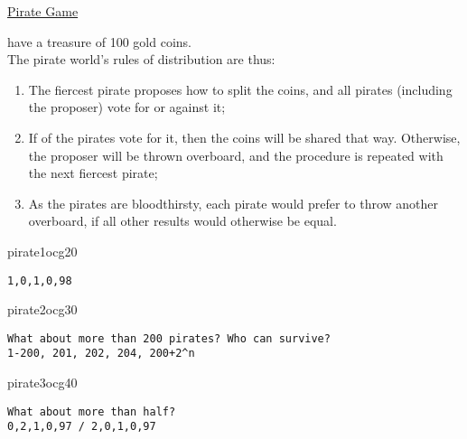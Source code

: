 \documentclass[UTF8,aspectratio=43,11pt,colorlinks,compress,openany]{beamer}%
\begin{document}
\begin{frame}[fragile]{\href{https://mp.weixin.qq.com/s/LLUoU0gl3t6GTh6jDef5vA}{Pirate Game}}
	\begin{problem}
		 have a treasure of 100 gold coins.\\
		The pirate world's rules of distribution are thus:
		\begin{enumerate}
			\item The fiercest pirate proposes how to split the coins, and all pirates (including the proposer) vote for or against it;
			\item If  of the pirates vote for it, then the coins will be shared that way. Otherwise, the proposer will be thrown overboard, and the procedure is repeated with the next fiercest pirate;
			\item As the pirates are bloodthirsty, each pirate would prefer to throw another overboard, if all other results would otherwise be equal.
		\end{enumerate}
	\end{problem}
\begin{ocg}{pirate1}{ocg2}{0}
\begin{verbatim}
1,0,1,0,98
\end{verbatim}
\end{ocg}
\begin{ocg}{pirate2}{ocg3}{0}
\begin{verbatim}
What about more than 200 pirates? Who can survive?
1-200, 201, 202, 204, 200+2^n
\end{verbatim}
\end{ocg}
\begin{ocg}{pirate3}{ocg4}{0}
\begin{verbatim}
What about more than half?
0,2,1,0,97 / 2,0,1,0,97
\end{verbatim}
\end{ocg}
\end{frame}
\end{document}
